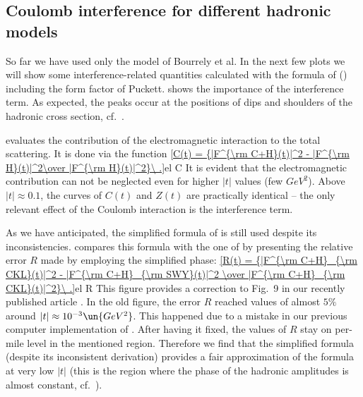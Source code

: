 \eject
\subsection[int mod]{Coulomb interference for different hadronic models}

So far we have used only the model of Bourrely et al. In the next few plots we will show some interference-related quantities calculated with the formula of \KaL{} () including the form factor of Puckett.  shows the importance of the interference term. As expected, the peaks occur at the positions of dips and shoulders of the hadronic cross section, cf.~.


 evaluates the contribution of the electromagnetic interaction to the total scattering. It is done via the function
\eqref{C(t) = {|F^{\rm C+H}(t)|^2 - |F^{\rm H}(t)|^2\over |F^{\rm H}(t)|^2}\ .}{el C}
It is evident that the electromagnetic contribution can not be neglected even for higher $|t|$ values (few $GeV^2$). Above $|t|\approx 0.1$, the curves of $C(t)$ and $Z(t)$ are practically identical -- the only relevant effect of the Coulomb interaction is the interference term.


As we have anticipated, the simplified formula of \WaY{} is still used despite its inconsistencies.  compares this formula with the one of \KaL{} by presenting the relative error $R$ made by employing the simplified \WY{} phase:
\eqref{R(t) = {|F^{\rm C+H}_{\rm CKL}(t)|^2 - |F^{\rm C+H}_{\rm SWY}(t)|^2 \over |F^{\rm C+H}_{\rm CKL}(t)|^2}\ .}{el R}
This figure provides a correction to Fig.~9 in our recently published article . In the old figure, the error $R$ reached values of almost $5\%$ around $|t|\approx 10^{-3}\un{GeV^2}$. This happened due to a mistake in our previous computer implementation of . After having it fixed, the values of $R$ stay on per-mile level in the mentioned region. Therefore we find that the simplified \WY{} formula (despite its inconsistent derivation) provides a fair approximation of the \KL{} formula at very low $|t|$ (this is the region where the phase of the hadronic amplitudes is almost constant, cf.~).

